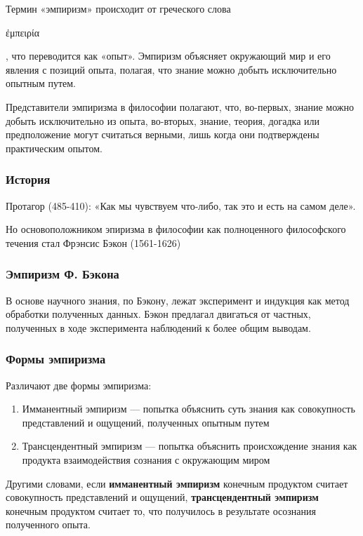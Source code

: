 \documentclass{article}
\begin{document}
\begin{flushleft}

Термин «эмпиризм» происходит от греческого слова \begin{greektext}ἐμπειρία\end{greektext}, что переводится как «опыт». Эмпиризм объясняет окружающий мир и его явления с позиций опыта, полагая, что знание можно добыть исключительно опытным путем.

Представители эмпиризма в философии полагают, что, во-первых, знание можно добыть исключительно из опыта, во-вторых, знание, теория, догадка или предположение могут считаться верными, лишь когда они подтверждены практическим опытом.

\subsubsection{История}

Протагор (485-410): «Как мы чувствуем что-либо, так это и есть на самом деле».

Но основоположником эпиризма в философии как полноценного философского течения стал Фрэнсис Бэкон (1561-1626)

\subsubsection{Эмпиризм Ф. Бэкона}

В основе научного знания, по Бэкону, лежат эксперимент и индукция как метод обработки полученных данных. Бэкон предлагал двигаться от частных, полученных в ходе эксперимента наблюдений к более общим выводам.

\subsubsection{Формы эмпиризма}

Различают две формы эмпиризма:

\begin{enumerate}
    \item Имманентный эмпиризм — попытка объяснить суть знания как совокупность представлений и ощущений, полученных опытным путем
    \item Трансцендентный эмпиризм — попытка объяснить происхождение знания как продукта взаимодействия сознания с окружающим миром
\end{enumerate}

Другими словами, если \textbf{имманентный эмпиризм} конечным продуктом считает совокупность представлений и ощущений, \textbf{трансцендентный эмпиризм} конечным продуктом считает то, что получилось в результате осознания полученного опыта.


\end{flushleft}
\end{document}
